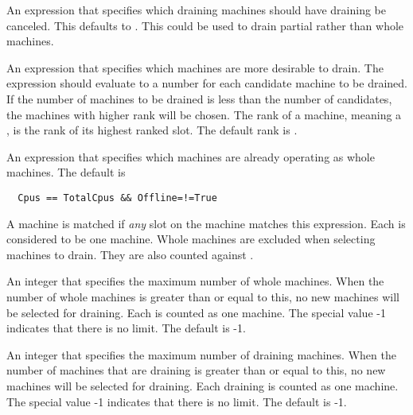 \begin{description}
\label{param:DefragCancelRequirements}
\item[\Macro{DEFRAG\_CANCEL\_REQUIREMENTS}] An expression that specifies
  which draining machines should have draining be canceled.  This defaults
  to .  This could be used to drain
  partial rather than whole machines.

\label{param:DefragRank}
\item[\Macro{DEFRAG\_RANK}] An expression that specifies which machines
  are more desirable to drain.  
  The expression should evaluate to a number for each
  candidate machine to be drained.  If the number of machines to be
  drained is less than the number of candidates, 
  the machines with higher rank will be chosen.  
  The rank of a machine, meaning a ,
  is the rank of its highest ranked slot.
  The default rank is .

\label{param:DefragWholeMachineExpr}
\item[\Macro{DEFRAG\_WHOLE\_MACHINE\_EXPR}] An expression that
  specifies which machines are already operating as whole machines.  
  The default is 
\begin{verbatim}
  Cpus == TotalCpus && Offline=!=True
\end{verbatim}
  A machine is
  matched if \emph{any} slot on the machine matches this expression.
  Each  is considered to be one machine.  Whole machines
  are excluded when selecting machines to drain.  They are also counted
  against .

\label{param:DefragMaxWholeMachines}
\item[\Macro{DEFRAG\_MAX\_WHOLE\_MACHINES}] An integer that specifies
  the maximum number of whole machines.  When the number of whole
  machines is greater than or equal to this, 
  no new machines will be selected for draining.  
  Each  is counted as one machine.  
  The special value -1 indicates that there is no limit.
  The default is -1.

\label{param:DefragMaxConcurrentDraining}
\item[\Macro{DEFRAG\_MAX\_CONCURRENT\_DRAINING}] An integer that
  specifies the maximum number of draining machines.  
  When the number of machines that are draining is greater than 
  or equal to this, no new machines will be selected for draining.
  Each draining  is counted as one machine.  
  The special value -1 indicates that there is no limit.  
  The default is -1.


\end{description}
